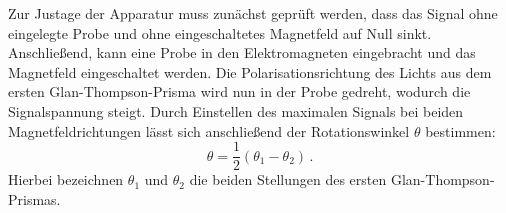 Zur Justage der Apparatur muss zunächst geprüft werden, dass das Signal ohne
eingelegte Probe und ohne eingeschaltetes Magnetfeld auf Null sinkt.
Anschließend, kann eine Probe in den Elektromagneten eingebracht und
das Magnetfeld eingeschaltet werden.
Die Polarisationsrichtung des Lichts aus dem ersten Glan-Thompson-Prisma wird
nun in der Probe gedreht, wodurch die Signalspannung steigt.
Durch Einstellen des maximalen Signals bei beiden Magnetfeldrichtungen
lässt sich anschließend der Rotationswinkel $\theta$ bestimmen:
\begin{equation}
    \label{eqn:theta_messung}
    \theta = \frac{1}{2}\left(\theta_1-\theta_2\right)\,.
\end{equation}
Hierbei bezeichnen $\theta_1$ und $\theta_2$ die beiden Stellungen des ersten
Glan-Thompson-Prismas.


